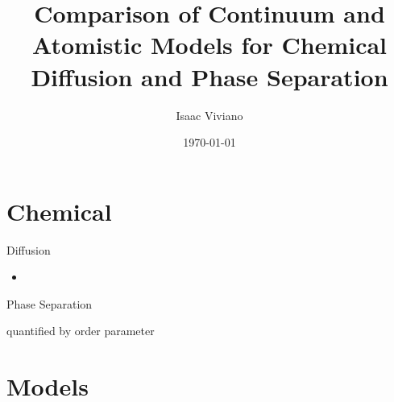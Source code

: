 \documentclass{beamer}
\theoremstyle{remark}
\begin{document}
\begin{frame}
	
	\title{Comparison of Continuum and Atomistic Models for Chemical Diffusion and Phase Separation}
	\date{\today}
	\author{Isaac Viviano}

	\maketitle

\end{frame}

\begin{frame}
	
	\tableofcontents

\end{frame}

\section{Chemical}

\begin{frame}{Diffusion}

	\begin{itemize}
		\item 
	\end{itemize}
	
\end{frame}

\begin{frame}{Phase Separation}
	
	quantified by order parameter
	
	\begin{figure}
	\end{figure}
\end{frame}

\section{Models}
\end{document}
